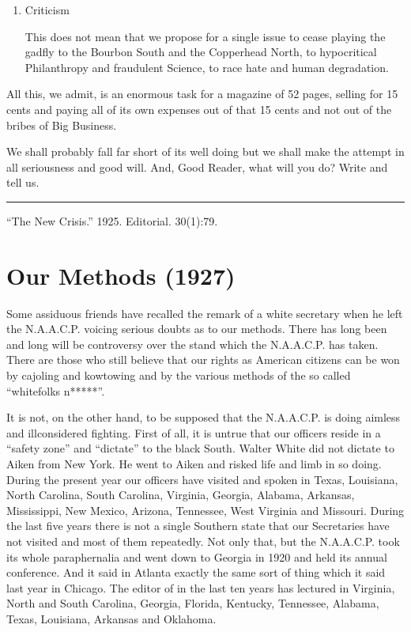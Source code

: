\documentclass[letterpaper,10pt,english]{jupyterBook}
\begin{document}
\begin{enumerate}
\item {} 
\sphinxAtStartPar
Criticism

\sphinxAtStartPar
This does not mean that we propose for a single issue to cease playing the gadfly to the Bourbon South and the Copperhead North, to hypocritical Philanthropy and fraudulent Science, to race hate and human degradation.

\end{enumerate}

\sphinxAtStartPar
All this, we admit, is an enormous task for a magazine of 52 pages, selling for 15 cents and paying all of its own expenses out of that 15 cents and not out of the bribes of Big Business.

\sphinxAtStartPar
We shall probably fall far short of its well doing but we shall make the attempt in all seriousness and good will. And, Good Reader, what will you do? Write and tell us.


\bigskip\hrule\bigskip


\sphinxAtStartPar
{} “The New Crisis.” 1925. Editorial.  30(1):7\sphinxhyphen{}9.


\section{Our Methods (1927)}
\label{\detokenize{Volumes/33/03/our_methods:our-methods-1927}}\label{\detokenize{Volumes/33/03/our_methods::doc}}
\sphinxAtStartPar
Some assiduous friends have recalled the remark of a white secretary when he left the N.A.A.C.P. voicing serious doubts as to our methods. There has long been and long will be controversy over the stand which the N.A.A.C.P. has taken. There are those who still believe that our rights as American citizens can be won by cajoling and kow\sphinxhyphen{}towing and by the various methods of the so called “white\sphinxhyphen{}folks n*****”.

\sphinxAtStartPar
It is not, on the other hand, to be supposed that the N.A.A.C.P. is doing aimless and ill\sphinxhyphen{}considered fighting. First of all, it is untrue that our officers reside in a “safety zone” and “dictate” to the black South. Walter White did not dictate to Aiken from New York. He went to Aiken and risked life and limb in so doing. During the present year our officers have visited and spoken in Texas, Louisiana, North Carolina, South Carolina, Virginia, Georgia, Alabama, Arkansas, Mississippi, New Mexico, Arizona, Tennessee, West Virginia and Missouri. During the last five years there is not a single Southern state that our Secretaries have not visited and most of them repeatedly. Not only that, but the N.A.A.C.P. took its whole paraphernalia and went down to Georgia in 1920 and held its annual conference. And it said in Atlanta exactly the same sort of thing which it said last year in Chicago. The editor of  in the last ten years has lectured in Virginia, North and South Carolina, Georgia, Florida, Kentucky, Tennessee, Alabama, Texas, Louisiana, Arkansas and Oklahoma.
\end{document}
